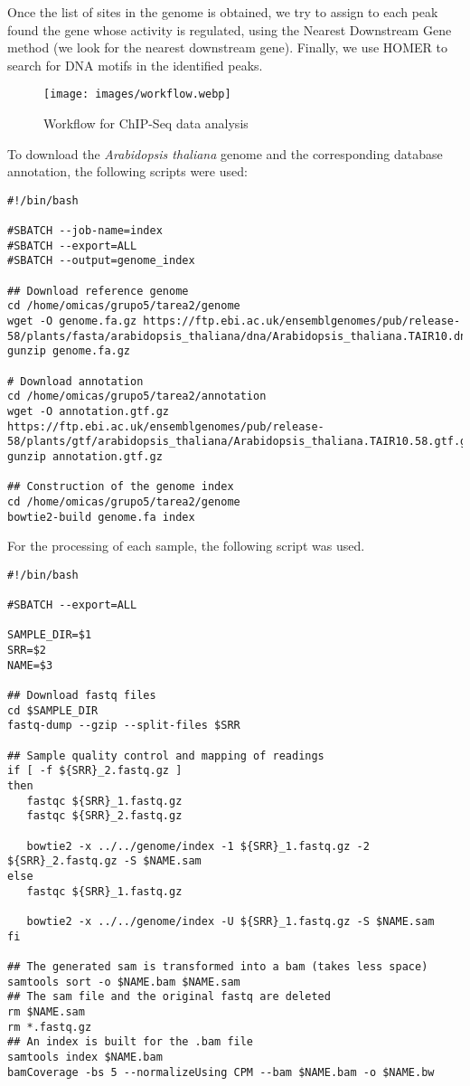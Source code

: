 \documentclass[
]{article}
\begin{document}
Once the list of sites in the genome is obtained, we try to assign to
each peak found the gene whose activity is regulated, using the Nearest
Downstream Gene method (we look for the nearest downstream gene).
Finally, we use HOMER to search for DNA motifs in the identified peaks.

\begin{figure}
\centering
\texttt{[image: images/workflow.webp]}
\caption{Workflow for ChIP-Seq data analysis}
\end{figure}

To download the \emph{Arabidopsis thaliana} genome and the corresponding
database annotation, the following scripts were used:

\begin{verbatim}
#!/bin/bash

#SBATCH --job-name=index
#SBATCH --export=ALL
#SBATCH --output=genome_index

## Download reference genome
cd /home/omicas/grupo5/tarea2/genome
wget -O genome.fa.gz https://ftp.ebi.ac.uk/ensemblgenomes/pub/release-58/plants/fasta/arabidopsis_thaliana/dna/Arabidopsis_thaliana.TAIR10.dna.toplevel.fa.gz
gunzip genome.fa.gz

# Download annotation
cd /home/omicas/grupo5/tarea2/annotation
wget -O annotation.gtf.gz https://ftp.ebi.ac.uk/ensemblgenomes/pub/release-58/plants/gtf/arabidopsis_thaliana/Arabidopsis_thaliana.TAIR10.58.gtf.gz
gunzip annotation.gtf.gz

## Construction of the genome index
cd /home/omicas/grupo5/tarea2/genome
bowtie2-build genome.fa index
\end{verbatim}

For the processing of each sample, the following script was used.

\begin{verbatim}
#!/bin/bash

#SBATCH --export=ALL

SAMPLE_DIR=$1
SRR=$2
NAME=$3

## Download fastq files
cd $SAMPLE_DIR
fastq-dump --gzip --split-files $SRR

## Sample quality control and mapping of readings
if [ -f ${SRR}_2.fastq.gz ]
then
   fastqc ${SRR}_1.fastq.gz
   fastqc ${SRR}_2.fastq.gz

   bowtie2 -x ../../genome/index -1 ${SRR}_1.fastq.gz -2 ${SRR}_2.fastq.gz -S $NAME.sam
else
   fastqc ${SRR}_1.fastq.gz

   bowtie2 -x ../../genome/index -U ${SRR}_1.fastq.gz -S $NAME.sam
fi

## The generated sam is transformed into a bam (takes less space)
samtools sort -o $NAME.bam $NAME.sam
## The sam file and the original fastq are deleted
rm $NAME.sam
rm *.fastq.gz
## An index is built for the .bam file
samtools index $NAME.bam
bamCoverage -bs 5 --normalizeUsing CPM --bam $NAME.bam -o $NAME.bw
\end{verbatim}
\end{document}
